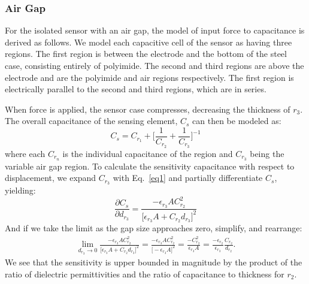 \subsubsection{Air Gap}

For the isolated sensor with an air gap, the model of input force to capacitance is derived as follows.
We model each capacitive cell of the sensor as having three regions. The first region is between the 
electrode and the bottom of the steel case, consisting entirely of polyimide. The second and third regions
are above the electrode and are the polyimide and air regions respectively. The first region is electrically
parallel to the second and third regions, which are in series. 

When force is applied, the sensor case compresses, decreasing the thickness of $r_3$.
The overall capacitance of the sensing element, $C_s$ can then be modeled as:
\begin{equation}
C_{s} = C_{r_1} + \bigg[ \frac{1}{C_{r_2}} + \frac{1}{C_{r_3}} \bigg] ^{-1}
\end{equation}
where each $C_{r_n}$ is the individual capacitance of the region 
and $C_{r_3}$ being the variable air gap region.
To calculate the sensitivity capacitance with respect to displacement, 
we expand $C_{r_3}$ with Eq.~\ref{eq1} and partially differentiate $C_s$, yielding:
\begin{equation}
\frac{\partial C_{s}}{\partial d_{r_3}} = 
\frac{-\epsilon_{r_3} A C_{r_2}^2}
{\bigg[ \epsilon_{r_3} A + C_{r_2} d_{r_3} \bigg]^2 }
\end{equation}
And if we take the limit as the gap size approaches zero, simplify, and rearrange:
\begin{align}
\lim_{d_{r_3} \to 0} 
\frac{-\epsilon_{r_3} A C_{r_2}^2}
{\bigg[ \epsilon_{r_3} A + C_{r_2} d_{r_3} \bigg]^2 } = 
\frac{-\epsilon_{r_3} A C_{r_2}^2}
{\bigg[ -\epsilon_{r_3} A \bigg]^2 } = 
\frac{-C_{r_2}^2}
{ \epsilon_{r_3} A } = 
\frac{-\epsilon_{r_2} }{\epsilon_{r_3} }
\frac{C_{r_2}}{d_{r_2}}.
\end{align}
We see that the sensitivity is upper bounded in magnitude 
by the product of the ratio of dielectric permittivities and the ratio of capacitance to thickness for $r_2$.



